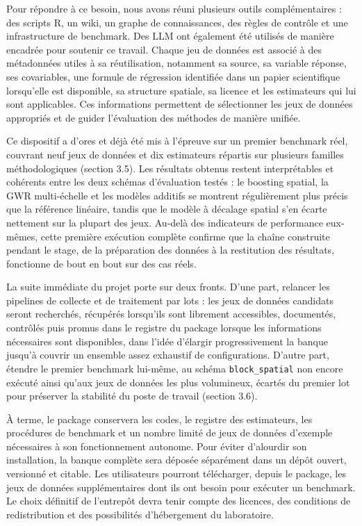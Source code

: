 \documentclass[11pt,a4paper]{article}
\begin{document}
Pour répondre à ce besoin, nous avons réuni plusieurs outils complémentaires : des scripts R, un wiki, un graphe de connaissances, des règles de contrôle et une infrastructure de benchmark. Des LLM ont également été utilisés de manière encadrée pour soutenir ce travail. Chaque jeu de données est associé à des métadonnées utiles à sa réutilisation, notamment sa source, sa variable réponse, ses covariables, une formule de régression identifiée dans un papier scientifique lorsqu'elle est disponible, sa structure spatiale, sa licence et les estimateurs qui lui sont applicables. Ces informations permettent de sélectionner les jeux de données appropriés et de guider l'évaluation des méthodes de manière unifiée.

Ce dispositif a d'ores et déjà été mis à l'épreuve sur un premier benchmark réel, couvrant neuf jeux de données et dix estimateurs répartis sur plusieurs familles méthodologiques (section 3.5). Les résultats obtenus restent interprétables et cohérents entre les deux schémas d'évaluation testés : le boosting spatial, la GWR multi-échelle et les modèles additifs se montrent régulièrement plus précis que la référence linéaire, tandis que le modèle à décalage spatial s'en écarte nettement sur la plupart des jeux. Au-delà des indicateurs de performance eux-mêmes, cette première exécution complète confirme que la chaîne construite pendant le stage, de la préparation des données à la restitution des résultats, fonctionne de bout en bout sur des cas réels.

La suite immédiate du projet porte sur deux fronts. D'une part, relancer les pipelines de collecte et de traitement par lots : les jeux de données candidats seront recherchés, récupérés lorsqu'ils sont librement accessibles, documentés, contrôlés puis promus dans le registre du package lorsque les informations nécessaires sont disponibles, dans l'idée d'élargir progressivement la banque jusqu'à couvrir un ensemble assez exhaustif de configurations. D'autre part, étendre le premier benchmark lui-même, au schéma \texttt{block\_spatial} non encore exécuté ainsi qu'aux jeux de données les plus volumineux, écartés du premier lot pour préserver la stabilité du poste de travail (section 3.6).

À terme, le package conservera les codes, le registre des estimateurs, les procédures de benchmark et un nombre limité de jeux de données d'exemple nécessaires à son fonctionnement autonome. Pour éviter d'alourdir son installation, la banque complète sera déposée séparément dans un dépôt ouvert, versionné et citable. Les utilisateurs pourront télécharger, depuis le package, les jeux de données supplémentaires dont ils ont besoin pour exécuter un benchmark. Le choix définitif de l'entrepôt devra tenir compte des licences, des conditions de redistribution et des possibilités d'hébergement du laboratoire.
\end{document}
